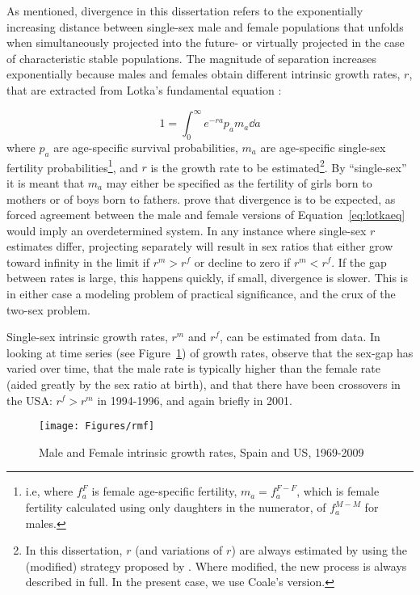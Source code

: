  \FloatBarrier
 \label{sex:divlotkar}
As mentioned, divergence in this dissertation refers to the exponentially
increasing distance between single-sex male and female populations that unfolds
when simultaneously projected into the future- or virtually projected in the
case of characteristic stable populations. The magnitude of separation increases
exponentially because males and females obtain different intrinsic 
growth rates, $r$, that are extracted from Lotka's fundamental equation
\citep{sharpe1911problem}:

\begin{equation}
\label{eq:lotkaeq}
1 = \int _0 ^\infty e^{-ra}p_a m_a \dd a 
\end{equation}
where $p_a$ are age-specific survival probabilities, $m_a$ are age-specific
single-sex fertility probabilities\footnote{i.e, where $f_a^F$ is female
age-specific fertility,  $m_a = f_a^{F-F}$, which is female fertility calculated
using only daughters in the numerator, of $f_a^{M-M}$ for males.}, and $r$ is
the growth rate to be estimated\footnote{In this dissertation, $r$ (and 
variations of $r$) are always estimated by using the (modified) strategy proposed 
by \citet{coale1957new}. Where modified, the new process is always described in full. In the present
case, we use Coale's version.}. By ``single-sex'' it is meant that $m_a$ may
either be specified as the fertility of girls born to mothers or of boys born to
fathers. \citet{yellin1977comparison} prove that divergence is to be expected, as 
forced agreement between the male and female versions of Equation~\eqref{eq:lotkaeq}
 would imply an overdetermined system. In any instance
where single-sex $r$ estimates differ, projecting separately will result in sex
ratios that either grow toward infinity in the limit if $r^m
> r^f$ or decline to zero if $r^m < r^f$. If the gap between rates is large, this happens
quickly, if small, divergence is slower. This is in either case a modeling
problem of practical significance, and the crux of the two-sex problem. 

Single-sex intrinsic growth rates, $r^m$ and $r^f$, can be 
estimated from data. In looking at time series (see Figure~\ref{fig:rmf}) of 
 growth rates, observe that the sex-gap has varied over 
time, that the male rate is typically higher than the female rate (aided greatly 
by the sex ratio at birth), and that there have been crossovers in the USA: 
$r^f > r^m$ in 1994-1996, and again briefly in 2001. 

\begin{figure}[ht!]
        \centering  
          \caption{Male and Female intrinsic growth rates, Spain and US,
          1969-2009}
           \texttt{[image: Figures/rmf]}
          \label{fig:rmf}
\end{figure}

